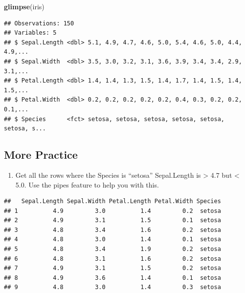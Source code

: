 \documentclass[]{book}
\newenvironment{Shaded}{\begin{snugshade}}{\end{snugshade}}
\newcommand{\FloatTok}[1]{\textcolor[rgb]{0.00,0.00,0.81}{#1}}
\newcommand{\KeywordTok}[1]{\textcolor[rgb]{0.13,0.29,0.53}{\textbf{#1}}}
\newcommand{\NormalTok}[1]{#1}
\newcommand{\OperatorTok}[1]{\textcolor[rgb]{0.81,0.36,0.00}{\textbf{#1}}}
\newcommand{\StringTok}[1]{\textcolor[rgb]{0.31,0.60,0.02}{#1}}
\providecommand{\tightlist}{%
  \setlength{\itemsep}{0pt}\setlength{\parskip}{0pt}}
\begin{document}
\begin{Shaded}
\begin{Highlighting}[]
\KeywordTok{glimpse}\NormalTok{(iris)}
\end{Highlighting}
\end{Shaded}

\begin{verbatim}
## Observations: 150
## Variables: 5
## $ Sepal.Length <dbl> 5.1, 4.9, 4.7, 4.6, 5.0, 5.4, 4.6, 5.0, 4.4, 4.9,...
## $ Sepal.Width  <dbl> 3.5, 3.0, 3.2, 3.1, 3.6, 3.9, 3.4, 3.4, 2.9, 3.1,...
## $ Petal.Length <dbl> 1.4, 1.4, 1.3, 1.5, 1.4, 1.7, 1.4, 1.5, 1.4, 1.5,...
## $ Petal.Width  <dbl> 0.2, 0.2, 0.2, 0.2, 0.2, 0.4, 0.3, 0.2, 0.2, 0.1,...
## $ Species      <fct> setosa, setosa, setosa, setosa, setosa, setosa, s...
\end{verbatim}

\hypertarget{more-practice}{%
\subsection{More Practice}\label{more-practice}}

\begin{enumerate}
\def\labelenumi{\arabic{enumi})}
\tightlist
\item
  Get all the rows where the Species is ``setosa'' Sepal.Length is \textgreater{} 4.7
  but \textless{} 5.0. Use the pipes feature to help you with this.
\end{enumerate}

\begin{Shaded}
\end{Shaded}

\begin{verbatim}
##   Sepal.Length Sepal.Width Petal.Length Petal.Width Species
## 1          4.9         3.0          1.4         0.2  setosa
## 2          4.9         3.1          1.5         0.1  setosa
## 3          4.8         3.4          1.6         0.2  setosa
## 4          4.8         3.0          1.4         0.1  setosa
## 5          4.8         3.4          1.9         0.2  setosa
## 6          4.8         3.1          1.6         0.2  setosa
## 7          4.9         3.1          1.5         0.2  setosa
## 8          4.9         3.6          1.4         0.1  setosa
## 9          4.8         3.0          1.4         0.3  setosa
\end{verbatim}
\end{document}
